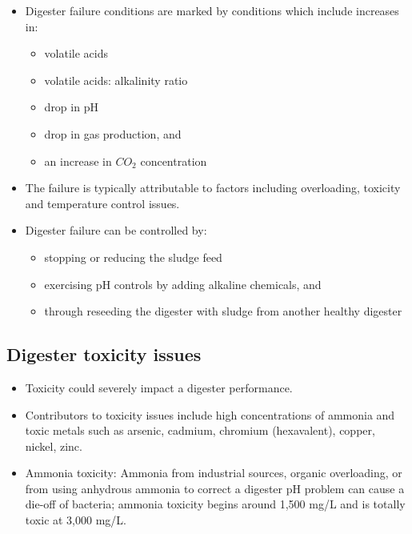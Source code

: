                     \begin{itemize}
                        \item Digester failure conditions are marked by conditions which include increases in:
                        \begin{itemize}
                            \item volatile acids
                            \item volatile acids: alkalinity ratio
                            \item drop in pH
                            \item drop in gas production, and 
                            \item an increase in $CO_2$ concentration
                        \end{itemize}
                        \item The failure is typically attributable to factors including overloading, toxicity and temperature control issues.
                        \item Digester failure can be controlled by:
                        \begin{itemize}
                            \item stopping or reducing the sludge feed
                            \item exercising pH controls by adding alkaline chemicals, and 
                            \item through reseeding the digester with sludge from another healthy digester
                        \end{itemize}
                    \end{itemize}
\subsection{Digester toxicity issues} 

                \begin{itemize}
                \item Toxicity could severely impact a digester performance.
                \item Contributors to toxicity issues include high concentrations of ammonia and toxic metals such as arsenic, cadmium, chromium (hexavalent), copper, nickel, zinc. 
                \item Ammonia toxicity: Ammonia from industrial sources, organic overloading, or from using anhydrous ammonia to correct a digester pH problem can cause a die-off of bacteria; ammonia toxicity begins around 1,500 mg/L and is totally toxic at 3,000 mg/L.  
                \end{itemize}

